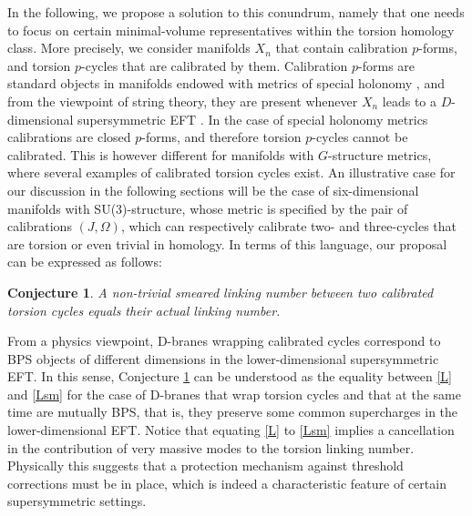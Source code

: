 \documentclass[11pt]{article}
\newtheorem{conjecture}{Conjecture}
\begin{document}
In the following, we  propose a solution to this conundrum, namely that one needs to focus on certain minimal-volume representatives within the torsion homology class. More precisely, we consider manifolds $X_n$ that contain calibration $p$-forms, and torsion $p$-cycles that are calibrated by them. Calibration $p$-forms are standard objects in manifolds endowed with metrics of special holonomy \cite{Harvey:1982xk}, and from the viewpoint of string theory, they are present whenever $X_n$ leads to a $D$-dimensional supersymmetric EFT \cite{Martucci:2005ht,Koerber:2005qi,Koerber:2010bx}. In the case of special holonomy metrics calibrations are closed $p$-forms, and therefore torsion $p$-cycles cannot be calibrated. This is however different for manifolds with $G$-structure metrics, where several examples of calibrated torsion cycles exist. An illustrative case for our discussion in the following sections  will be the case of six-dimensional manifolds with SU(3)-structure, whose metric is specified by the pair of calibrations $(J, \Omega)$, which can respectively calibrate two- and three-cycles that are torsion or even trivial in homology. In terms of this language, our proposal can be expressed as follows:

\begin{conjecture}

A non-trivial smeared linking number between two calibrated torsion cycles equals their actual linking number. 

\label{conj:BPS}
\end{conjecture}

From a physics viewpoint, D-branes wrapping calibrated cycles correspond to BPS objects of different dimensions in the lower-dimensional supersymmetric EFT. In this sense, Conjecture \ref{conj:BPS} can be understood as the equality between \eqref{L} and \eqref{Lsm} for the case of D-branes that wrap torsion cycles and that at the same time are mutually BPS, that is, they preserve some common supercharges in the lower-dimensional EFT.      Notice that equating \eqref{L} to \eqref{Lsm} implies a cancellation in the contribution of very massive modes to the torsion linking number. Physically this suggests that a protection mechanism against threshold corrections must be in place, which is indeed a characteristic feature of certain supersymmetric settings.
\end{document}

